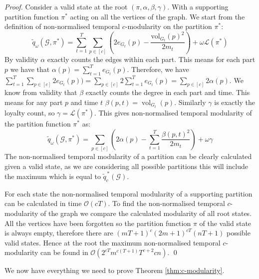 \documentclass[runningheads]{llncs}
\DeclareMathOperator{\vol}{vol}
\newcommand{\cG}{\mathcal{G}}
\newcommand{\loy}{\mathcal{L}}
\begin{document}
\begin{proof}
Consider a valid state at the root $(\pi,\alpha,\beta,\gamma)$.
With a supporting partition function $\pi^*$ acting on all the vertices of the graph.
We start from the definition of non-normalised temporal $c$-modularity on the partition $\pi^*$:
    \[
        \widetilde{q}_\omega(\cG,\pi^*) = \sum_{t=1}^T \sum_{p \in [c]} \left( 2e_{G_t}(p) - \frac{\text{vol}_{G_t}(p)^2}{2m_t}\right) + \omega \loy(\pi^*)
    \]
    By validity $\alpha$ exactly counts the edges within each part. This means for each part $p$ we have that $\alpha(p)=\sum_{t=1}^Te_{G_t}(p)$. Therefore, we have $\sum_{t=1}^T \sum_{p \in [c]} 2e_{G_t}(p))=\sum_{p\in[c]} 2\sum_{t=1}^T e_{G_t}(p)$$=\sum_{p \in [c]}2\alpha(p)$.
    We know from validity that $\beta$ exactly counts the degree in each part and time. This means for any part $p$ and time $t$ $\beta(p,t)=\vol_{G_t}(p)$.
    Similarly $\gamma$ is exactly the loyalty count, so $\gamma=\loy(\pi^*)$.
    This gives non-normalised temporal modularity of the partition function $\pi^*$ as:
    \[
        \widetilde{q}_\omega(\cG,\pi^*) = \sum_{p \in [c]} \left( 2\alpha(p) -\sum_{t=1}^T  \frac{\beta(p,t)^2}{2m_t}\right) + \omega \gamma
    \]
The non-normalised temporal modularity of a partition can be clearly calculated given a valid state, as we are considering all possible partitions this will include the maximum which is equal to $\widetilde{q}^{\,*}_c(\cG)$.
    
For each state the non-normalised temporal modularity of a supporting partition can be calculated in time $\mathcal{O}(cT)$.
To find the non-normalised temporal $c$-modularity of the graph we compare the calculated modularity of all root states. All the vertices have been forgotten so the partition function $\pi$ of the valid state is always empty, therefore there are $(mT+1)^c(2m+1)^{cT}(nT+1)$ possible valid states. Hence at the root the maximum non-normalised temporal $c$-modularity can be found in $\mathcal{O}(2^{cT}m^{c(T+1)}T^{c+2}cn)$.
\qed
\end{proof}

We now have everything we need to prove Theorem \ref{thm:c-modularity}.
\end{document}
